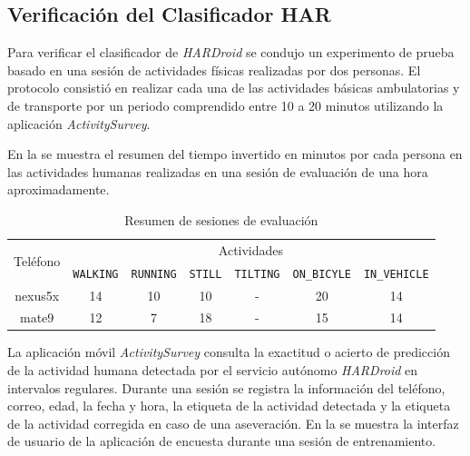 \subsection{Verificación del Clasificador HAR}

\label{ssec6:verificacion}Para verificar el clasificador 
de \emph{HARDroid }se condujo un experimento de prueba basado en una
sesión de actividades físicas realizadas por dos personas. El protocolo
consistió en realizar cada una de las actividades básicas ambulatorias
y de transporte por un periodo comprendido entre 10 a 20 minutos utilizando
la aplicación \emph{ActivitySurvey}. 

En la  se muestra el resumen del tiempo invertido
en minutos por cada persona en las actividades humanas realizadas
en una sesión de evaluación de una hora aproximadamente.

\begin{table}[th]
\begin{centering}
\begin{tabular}{|c|c|c|c|c|c|c|}
\hline 
\multirow{2}{*}{Teléfono} & \multicolumn{6}{c|}{Actividades}\tabularnewline
\cline{2-7} 
 & \texttt{\footnotesize{}WALKING} & \texttt{\footnotesize{}RUNNING} & \texttt{\footnotesize{}STILL} & \texttt{\footnotesize{}TILTING} & \texttt{\footnotesize{}ON\_BICYLE} & \texttt{\footnotesize{}IN\_VEHICLE}\tabularnewline
\hline 
\hline 
nexus5x & 14 & 10 & 10 & - & 20 & 14\tabularnewline
\hline 
mate9 & 12 & 7 & 18 & - & 15 & 14\tabularnewline
\hline 
\end{tabular}
\par\end{centering}
\caption{\label{tab6:vsesiones}Resumen de sesiones de evaluación}
\end{table}

La aplicación móvil \emph{ActivitySurvey} consulta la exactitud o
acierto de predicción de la actividad humana detectada por el servicio
autónomo \emph{HARDroid} en intervalos regulares. Durante una sesión
se registra la información del teléfono, correo, edad, la fecha y
hora, la etiqueta de la actividad detectada y la etiqueta de la actividad
corregida en caso de una aseveración. En la 
se muestra la interfaz de usuario de la aplicación de encuesta durante
una sesión de entrenamiento.

